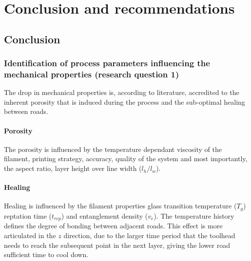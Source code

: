 \chapter{Conclusion and recommendations}
\label{chp:8}

\section{Conclusion}


\subsection{Identification of process parameters influencing the mechanical properties (research question 1)}
The drop in mechanical properties is, according to literature, accredited to the inherent porosity that is induced during the process and the sub-optimal healing between roads. 

\subsubsection{Porosity} 
The porosity is influenced by the temperature dependant viscosity of the filament, printing strategy, accuracy, quality of the system and most importantly, the aspect ratio, layer height over line width ($l_h/l_w$). 

\subsubsection{Healing} 
Healing is influenced by the filament properties glass transition temperature ($T_g$) reptation time ($t_{rep}$) and entanglement density ($v_e$). The temperature history defines the degree of bonding between adjacent roads. This effect is more articulated in the $z$ direction, due to the larger time period that the toolhead needs to reach the subsequent point in the next layer, giving the lower road sufficient time to cool down. 

